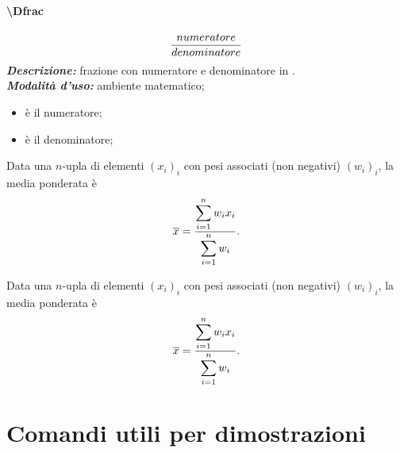 \paragraph{\textbackslash Dfrac}
\begin{equation*}
	\dfrac{\displaystyle numeratore}{\displaystyle denominatore}
\end{equation*}
\textbf{\textit{Descrizione:}} frazione con numeratore e denominatore in .\\
\textbf{\textit{Modalità d'uso:}} ambiente matematico;
\begin{itemize}
	\item {} è il numeratore;
	\item {} è il denominatore;
\end{itemize}
\begin{codelatex}
\end{codelatex}
\begin{example}{}
	Data una $n$-upla di elementi $(x_i)_i$ con pesi associati (non negativi) $(w_i)_i$, la media ponderata è \begin{equation*}
		\overline{x}=\dfrac{\displaystyle \sum_{i=1}^{n}w_ix_i}{\displaystyle \sum_{i=1}^{n}w_i}.
	\end{equation*}
\end{example}
\begin{codelatex}
Data una $n$-upla di elementi $(x_i)_i$ con pesi associati (non negativi) $(w_i)_i$, la media ponderata è
\begin{equation*}
	\overline{x}=\dfrac{\displaystyle \sum_{i=1}^{n}w_ix_i}{\displaystyle \sum_{i=1}^{n}w_i}.
\end{equation*}
\end{codelatex}
\section{Comandi utili per dimostrazioni}
